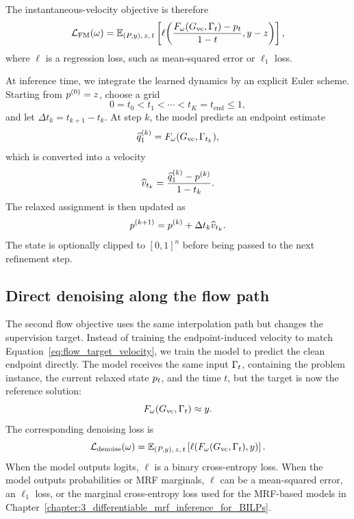 The instantaneous-velocity objective is therefore
\begin{equation}
    \mathcal{L}_{\mathrm{FM}}(\omega) = \mathbb{E}_{(P,y),\,z,\,t}
    \left[
        \ell\!\left(
            \frac{F_{\omega}(G_{\mathrm{vc}},\Gamma_t)-p_t}{1-t},
            y-z
        \right)
    \right],
    \label{eq:instant_velocity_loss}
\end{equation}
where $\ell$ is a regression loss, such as mean-squared error or $\ell_1$ loss.

At inference time, we integrate the learned dynamics by an explicit Euler scheme. Starting from $p^{(0)}=z$, choose a grid
\begin{equation}
    0=t_0<t_1<\cdots<t_K=t_{\mathrm{end}}\leq 1,
\end{equation}
and let $\Delta t_k=t_{k+1}-t_k$. At step $k$, the model predicts an endpoint estimate
\begin{equation*}
    \widehat {q}_1^{(k)}
    =
    F_{\omega}(G_{\mathrm{vc}}, \Gamma_{t_k}),
\end{equation*}
which is converted into a velocity
\begin{equation}
    \widehat {v}_{t_k}
    =
    \frac{\widehat {q}_1^{(k)}-p^{(k)}}{1-t_k}.
\end{equation}
The relaxed assignment is then updated as
\begin{equation}
    p^{(k+1)}
    =
    p^{(k)} + \Delta t_k \widehat {v}_{t_k}.
    \label{eq:flow_euler_update}
\end{equation}
The state is optionally clipped to $[0,1]^n$ before being passed to the next refinement step.

\subsection{Direct denoising along the flow path}

The second flow objective uses the same interpolation path but changes the supervision target. Instead of training the endpoint-induced velocity to match Equation~\eqref{eq:flow_target_velocity}, we train the model to predict the clean endpoint directly. The model receives the same input $\Gamma_t$, containing the problem instance, the current relaxed state $p_t$, and the time $t$, but the target is now the reference solution:
\begin{equation}
    F_{\omega}(G_{\mathrm{vc}}, \Gamma_t) \approx y .
\end{equation}
The corresponding denoising loss is
\begin{equation}
    \mathcal{L}_{\mathrm{denoise}}(\omega)
    =
    \mathbb{E}_{(P,y),\,z,\,t}
    \left[
        \ell\!\left(F_{\omega}(G_{\mathrm{vc}}, \Gamma_t), y \right)
    \right].
    \label{eq:flow_denoising_loss}
\end{equation}
When the model outputs logits, $\ell$ is a binary cross-entropy loss. When the model outputs probabilities or MRF marginals, $\ell$ can be a mean-squared error, an $\ell_1$ loss, or the marginal cross-entropy loss used for the MRF-based models in Chapter~\ref{chapter:3_differentiable_mrf_inference_for_BILPs}.

